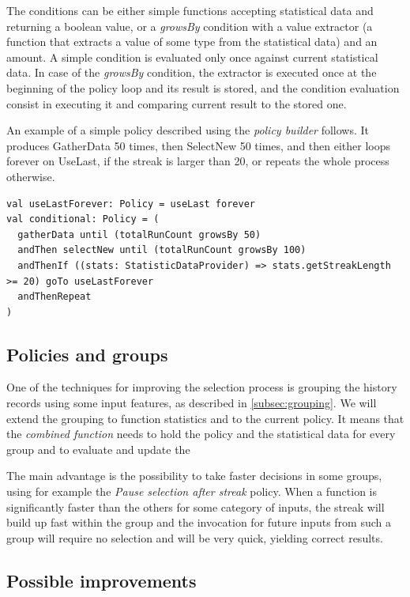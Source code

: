 The conditions can be either simple functions accepting statistical data and returning a boolean value, or a \textit{growsBy} condition with a value extractor (a function that extracts a value of some type from the statistical data) and an amount. A simple condition is evaluated only once against current statistical data. In case of the \textit{growsBy} condition, the extractor is executed once at the beginning of the policy loop and its result is stored, and the condition evaluation consist in executing it and comparing current result to the stored one.

An example of a simple policy described using the \textit{policy builder} follows. It produces GatherData 50 times, then SelectNew 50 times, and then either loops forever on UseLast, if the streak is larger than 20, or repeats the whole process otherwise.

\lstset{style=Scala}
\begin{lstlisting}
val useLastForever: Policy = useLast forever
val conditional: Policy = (
  gatherData until (totalRunCount growsBy 50)
  andThen selectNew until (totalRunCount growsBy 100)
  andThenIf ((stats: StatisticDataProvider) => stats.getStreakLength >= 20) goTo useLastForever
  andThenRepeat
)
\end{lstlisting}

\subsection{Policies and groups}

One of the techniques for improving the selection process is grouping the history records using some input features, as described in \ref{subsec:grouping}. We will extend the grouping to function statistics and to the current policy. It means that the \textit{combined function} needs to hold the policy and the statistical data for every group and to evaluate and update the 

The main advantage is the possibility to take faster decisions in some groups, using for example the \textit{Pause selection after streak} policy. When a function is significantly faster than the others for some category of inputs, the streak will build up fast within the group and the invocation for future inputs from such a group will require no selection and will be very quick, yielding correct results.

\subsection{Possible improvements}
\label{subsec:policy_improvements}

